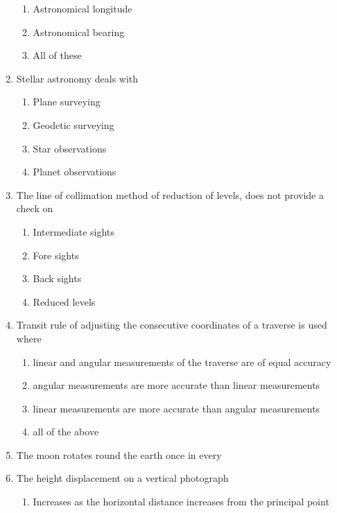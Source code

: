 \documentclass[11pt,a4paper]{article}
\begin{document}
\begin{enumerate}
\begin{enumerate}[label=\Alph*.]
\item{Astronomical longitude}
\item{Astronomical bearing}
\item{All of these}
\end{enumerate}
\item{Stellar astronomy deals with}
\begin{enumerate}[label=\Alph*.]
\item{Plane surveying}
\item{Geodetic surveying}
\item{Star observations}
\item{Planet observations}
\end{enumerate}
\item{The line of collimation method of reduction of levels, does not provide a check on}
\begin{enumerate}[label=\Alph*.]
\item{Intermediate sights}
\item{Fore sights}
\item{Back sights}
\item{Reduced levels}
\end{enumerate}
\item{Transit rule of adjusting the consecutive coordinates of a traverse is used where}
\begin{enumerate}[label=\Alph*.]
\item{linear and angular measurements of the traverse are of equal accuracy}
\item{angular measurements are more accurate than linear measurements}
\item{linear measurements are more accurate than angular measurements}
\item{all of the above}
\end{enumerate}
\item{The moon rotates round the earth once in every}
\\
\item{The height displacement on a vertical photograph}
\begin{enumerate}[label=\Alph*.]
\item{Increases as the horizontal distance increases from the principal point}

\end{enumerate}
\end{enumerate}
\end{document}
